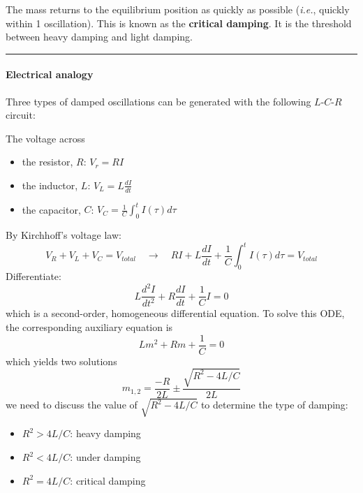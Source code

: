 \documentclass[12pt,a4paper]{article}
\begin{document}
The mass returns to the equilibrium position as quickly as possible (\textit{i.e.}, quickly within 1 oscillation). This is known as the \textbf{critical damping}. It is the threshold between heavy damping and light damping.\\

\hrule \vspace{.1cm}
\paragraph{Electrical analogy} Three types of damped oscillations can be generated with the following $L$-$C$-$R$ circuit:
\begin{figure}[H]
    \centering
\end{figure}

The voltage across 
\begin{itemize}
    \item the resistor, $R$: $\displaystyle V_{r} = RI$
    \item the inductor, $L$: $\displaystyle V_{L} = L\frac{dI}{dt}$
    \item the capacitor, $C$: $\displaystyle V_{C} = \frac{1}{C}\int_{0}^{t} I(\tau) d\tau$
\end{itemize}
By Kirchhoff's voltage law:
\[
    V_R + V_L + V_C = V_{total} \quad \to \quad RI + L \frac{dI}{dt} + \frac{1}{C}\int_{0}^{t} I(\tau) d\tau = V_{total} 
\]
Differentiate:
\[
    L \frac{d^2I}{dt^2} + R\frac{dI}{dt} + \frac{1}{C}I = 0
\]
which is a second-order, homogeneous differential equation. To solve this ODE, the corresponding auxiliary equation is
\[
    Lm^2 + Rm + \frac{1}{C} = 0
\]
which yields two solutions
\[
    m_{1, 2} = \frac{-R}{2L} \pm \frac{\sqrt{R^2 - 4L/C}}{2L}
\]
we need to discuss the value of $\sqrt{R^2 - 4L/C}$ to determine the type of damping:
\begin{itemize}
    \item $R^2 > 4L/C$: heavy damping
    \item $R^2 < 4L/C$: under damping
    \item $R^2 = 4L/C$: critical damping
\end{itemize}
\end{document}

